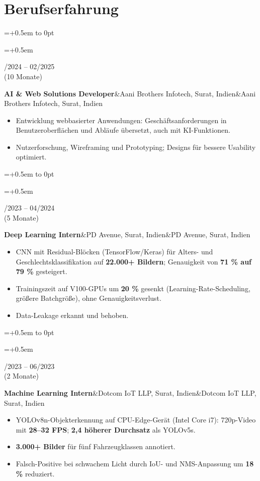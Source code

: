\documentclass[10pt,a4paper]{article}
\newlength{\leftcol}\setlength{\leftcol}{2.45cm}
\newcommand{\gap}{0.5em}
\newcommand{\sep}{\hspace{0.45em}\textbar\hspace{0.45em}}
\newcommand{\entry}[3]{%
  \begingroup\raggedright\leftskip=\dimexpr\leftcol+\gap\relax\noindent
  \hspace*{-\dimexpr\leftcol+\gap\relax}%
  \vtop to 0pt{\hsize=\dimexpr\leftcol+\gap\relax\raggedright\small\color{mid}\noindent #1\par\vss}%
  #2\par #3\par\endgroup\vspace{5pt}}
\newcommand{\etitle}[2]{\textbf{#1}\ifx&#2&\else\textcolor{mid}{\sep}#2\fi}
\begin{document}
\section*{Berufserfahrung}
\entry{05/2024 -- 02/2025\\(10 Monate)}
  {\etitle{AI \& Web Solutions Developer}{Aani Brothers Infotech, Surat, Indien}}
  {\begin{itemize}
    \item Entwicklung webbasierter Anwendungen: Geschäftsanforderungen in Benutzeroberflächen und Abläufe übersetzt, auch mit KI-Funktionen.
    \item Nutzerforschung, Wireframing und Prototyping; Designs für bessere Usability optimiert.
  \end{itemize}}
\entry{12/2023 -- 04/2024\\(5 Monate)}
  {\etitle{Deep Learning Intern}{PD Avenue, Surat, Indien}}
  {\begin{itemize}
    \item CNN mit Residual-Blöcken (TensorFlow/Keras) für Alters- und Geschlechtsklassifikation auf \textbf{22.000+ Bildern}; Genauigkeit von \textbf{71 \% auf 79 \%} gesteigert.
    \item Trainingszeit auf V100-GPUs um \textbf{20 \%} gesenkt (Learning-Rate-Scheduling, größere Batchgröße), ohne Genauigkeitsverlust.
    \item Data-Leakage erkannt und behoben.
  \end{itemize}}
\entry{05/2023 -- 06/2023\\(2 Monate)}
  {\etitle{Machine Learning Intern}{Dotcom IoT LLP, Surat, Indien}}
  {\begin{itemize}
    \item YOLOv8n-Objekterkennung auf CPU-Edge-Gerät (Intel Core i7): 720p-Video mit \textbf{28–32 FPS}; \textbf{2,4\texttimes{} höherer Durchsatz} als YOLOv5s.
    \item \textbf{3.000+ Bilder} für fünf Fahrzeugklassen annotiert.
    \item Falsch-Positive bei schwachem Licht durch IoU- und NMS-Anpassung um \textbf{18 \%} reduziert.
  \end{itemize}}
\end{document}
